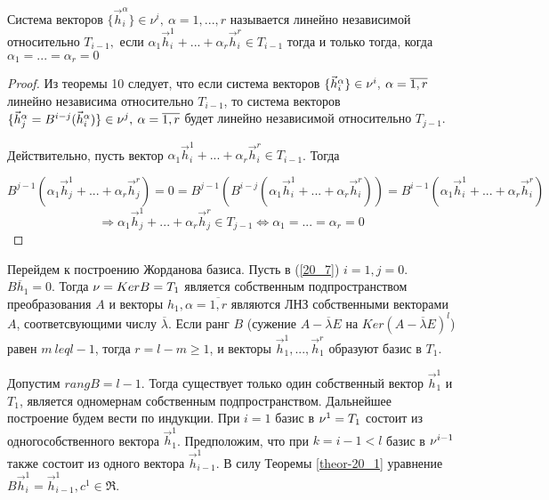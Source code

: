 \documentclass[a4paper, 12pt]{article}
\begin{document}
\begin{definition}
Система векторов $\{\vec{h}_i^{\alpha}\} \in \nu^i, \: \alpha = 1,...,r$ называется линейно  независимой относительно $T_{i - 1},$ если $\alpha_1 \vec{h}_i^1 + ... + \alpha_r \vec{h}_i^r \in T_{i-1}$ тогда и только тогда, когда $\alpha_1 = ... = \alpha_r = 0$
\begin{proof}
Из теоремы 10 следует, что если система векторов $\{\vec{h}_i^{\alpha}\} \in \nu^i, \: \alpha = \overline{1,r}$ линейно независима относительно $T_{i-1}$, то система векторов $\{\vec{h}_j^{\alpha} = B^{i-j} (\vec{h}^\alpha_i ) \} \in  \nu^j, \: \alpha = \overline{1,r}$ будет линейно независимой относительно $T_{j-1}.$

Действительно, пусть вектор $\alpha_1 \vec{h}_i^1 + ... + \alpha_r \vec{h}_i^r \in T_{i-1}$. Тогда

\[B^{j-1} (\alpha_1 \vec{h}_j^1 + ... + \alpha_r \vec{h}_j^r) = 0= B^{j - 1} ( B^{i - j} (\alpha_1 \vec{h}_i^1 + ... + \alpha_r \vec{h}_i^r)) = B^{i - 1}(\alpha_1 \vec{h}_i^1 + ... + \alpha_r \vec{h}_i^r)\] 
\[\Rightarrow \alpha_1 \vec{h}_j^1 + ... + \alpha_r \vec{h}_j^r \in T_{j-1} \Leftrightarrow \alpha_1 = ... = \alpha_r = 0\]
\end{proof}
\end{definition}

Перейдем к построению Жорданова базиса. Пусть в (\ref{20_7}) $i = 1, j = 0$. $B\overline{h}_1 = 0$. Тогда $\nu = Ker B = T_1$ является собственным подпространством преобразования $A$ и векторы $h_1, \alpha = \overline{1,r}$ являются ЛНЗ собственными векторами $A$, соответсвующими числу $\overline{\lambda}$. Если ранг $B$ (сужение $A - \overline{\lambda} E$ на $Ker (A - \overline{\lambda} E)^l$) равен $m \ leq l - 1$, тогда $r = l - m \geq 1$, и векторы $\vec{h}_1^1, ... , \vec{h}_1^r$ образуют базис в $T_1$.

Допустим $rangB = l - 1$. Тогда существует только один собственный вектор $\vec{h}_1^1$ и $T_1$, является одномернам собственным подпространством. Дальнейшее построение будем вести по индукции. При $i = 1$ базис в $\nu^1 = T_1$ состоит из одногособственного вектора $\vec{h}_1^1$. Предположим, что при $k = i - 1 < l$ базис в $\nu^{i-1}$ также состоит из одного вектора $\vec{h}_{i - 1}^1$. В силу Теоремы \ref{theor-20_1} уравнение $B\vec{h}_i^1 = \vec{h}_{i-1}^1, c^1\in \Re$.
\end{document}
